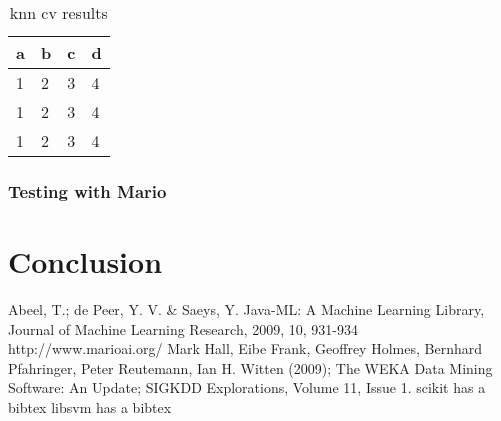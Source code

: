 \documentclass[]{article}   %
\begin{document}
\begin{table}[h!]
	\begin{center}
		\caption{knn cv results}
		\begin{tabular}{l | l | l | l }
		a & b & c & d \\
		\hline
		1 & 2 & 3 & 4 \\
		1 & 2 & 3 & 4 \\
		1 & 2 & 3 & 4 \\
		\hline
		\end{tabular}
	\end{center}
\end{table}
\subsubsection{Testing with Mario}

\section{Conclusion}


\begin{thebibliography}{9}
  Abeel, T.; de Peer, Y. V. \& Saeys, Y. Java-ML: A Machine Learning Library, Journal of Machine Learning Research, 2009, 10, 931-934
  http://www.marioai.org/
  Mark Hall, Eibe Frank, Geoffrey Holmes, Bernhard Pfahringer, Peter Reutemann, Ian H. Witten (2009); The WEKA Data Mining Software: An Update; SIGKDD Explorations, Volume 11, Issue 1.
  scikit has a bibtex
  libsvm has a bibtex
\end{thebibliography}
\end{document}
